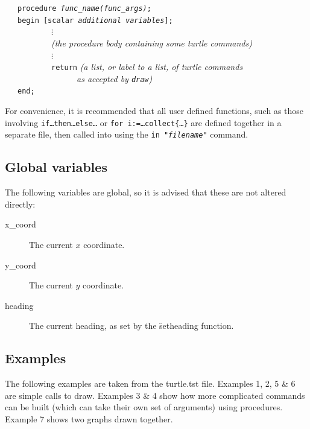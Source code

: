 
\begin{flushleft}
~~~\texttt{procedure \textit{func\_name(func\_args)};}\\
~~~\texttt{begin [scalar \textit{additional variables}];}\\
~~~~~~~~~~~$\vdots$\\
~~~~~~~~~~~\textit{(the procedure body containing some turtle commands)}\\
~~~~~~~~~~~$\vdots$\\
~~~~~~~~~~~\texttt{return} \textit{(a list, or label to a list, of turtle commands}\\
~~~~~~~~~~~~~~~~~\textit{as accepted by \texttt{draw})}\\
~~~\texttt{end;}
\end{flushleft}

  For convenience, it is recommended that all user defined functions, such
as those involving \texttt{if\ldots then\ldots else\ldots} or \texttt{for
i:=\ldots collect\{\ldots\}} are defined together in a separate file, then
called into {\REDUCE} using the \texttt{in "\textit{filename}"} command.

\subsection{Global variables}

The following variables are global, so it is advised that these are not altered directly:
\begin{description}
\item[x\_coord]
  \hypertarget{reserved:X_COORD}{}
  The current $x$ coordinate.
\item[y\_coord]
  \hypertarget{reserved:Y_COORD}{}
  The current $y$ coordinate.
\item[heading]
  \hypertarget{reserved:HEADING}{}
  The current heading, as set by the \f{setheading} function.
\end{description}

\subsection{Examples}

The following examples are taken from the turtle.tst file.
Examples 1, 2, 5 \& 6 are simple calls to draw. Examples 3 \& 4 show how
more complicated commands can be built (which can take their own set of
arguments) using procedures.
Example 7 shows two graphs drawn together.

